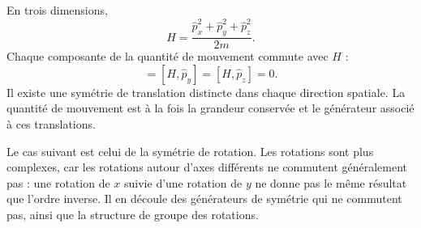 En trois dimensions,
\begin{equation}
H
=
\frac{\hat p_x^2+\hat p_y^2+\hat p_z^2}{2m}.
\end{equation}
Chaque composante de la quantité de mouvement commute avec \(H\) :
\begin{equation}
[H,\hat p_x]=[H,\hat p_y]=[H,\hat p_z]=0.
\end{equation}
Il existe une symétrie de translation distincte dans chaque direction spatiale. La quantité de mouvement est à la fois la grandeur conservée et le générateur associé à ces translations.

Le cas suivant est celui de la symétrie de rotation. Les rotations sont plus complexes, car les rotations autour d’axes différents ne commutent généralement pas : une rotation de \(x\) suivie d’une rotation de \(y\) ne donne pas le même résultat que l’ordre inverse. Il en découle des générateurs de symétrie qui ne commutent pas, ainsi que la structure de groupe des rotations.
